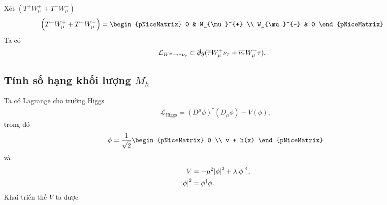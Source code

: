 \documentclass{report}
\newcommand{\f}[2]{\dfrac{#1}{#2}}
\begin{document}
Xét $\left( T^{+} W_{\mu}^{+} + T^{-} W_{\mu}^{-} \right)$
\begin{align*}
	\left( T^{+} W_{\mu}^{+} + T^{-} W_{\mu}^{-} \right)
	 & =
	\begin{pNiceMatrix}
		0           & W_{\mu}^{+} \\
		W_{\mu}^{-} & 0
	\end{pNiceMatrix}
\end{align*}
Ta có
\begin{align*}
	\mathcal{L}_{W^{\pm} \rightarrow \tau \nu_{\tau}}
	 & \subset \slashed{\partial} g (\overline{\tau} W_{\mu}^{+}\nu_{\tau}  + \overline{\nu_{\tau}}W_{\mu}^{-}\tau ).
\end{align*}
\subsection*{Tính số hạng khối lượng $M_{h}$}
Ta có Lagrange cho trường Higgs
\begin{align*}
	\mathcal{L}_{\text{Higgs}} = \left( D^{\mu}\phi \right)^{\dagger} \left( D_{\mu}\phi \right) - V(\phi), \tag{1}
\end{align*}
trong đó
\begin{align*}
	\phi = \f{1}{\sqrt{2}}
	\begin{pNiceMatrix}
		0 \\
		v + h(x)
	\end{pNiceMatrix}
\end{align*}
và
\begin{align*}
	V              & = -\mu^{2} \abs{\phi}^{2} + \lambda \abs{\phi}^{4}, \\
	\abs{\phi}^{2} & = \phi^{\dagger} \phi.
\end{align*}
Khai triển thế $V$ ta được
\end{document}
